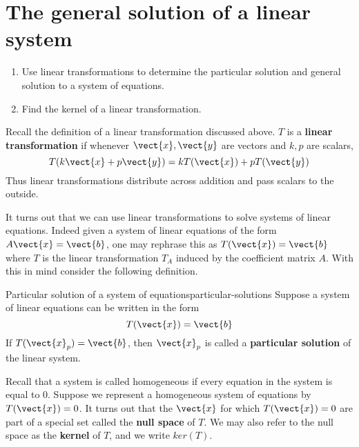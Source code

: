 \section{The general solution of a linear system}

\begin{outcome}
  \begin{enumerate}
  \item Use linear transformations to determine the particular
    solution and general solution to a system of equations.
  \item Find the kernel of a linear transformation.
  \end{enumerate}
\end{outcome}

Recall the definition of a linear transformation discussed above.
$T$ is a \textbf{linear transformation} if whenever $\vect{x}, \vect{y}$ are
vectors and $k,p$ are scalars,
\begin{equation*}
T(k\vect{x}+p\vect{y}) =k T (\vect{x}) +p T(\vect{y})
\end{equation*}
Thus linear transformations distribute across addition and pass scalars to
the outside.

It turns out that we can use linear transformations to solve
systems of linear equations. Indeed given a system of linear equations of the
form $A\vect{x}=\vect{b}$, one may rephrase this as $T(\vect{x})=\vect{b}$ where $T$ is the linear
transformation $T_A$ induced by the coefficient matrix $A$. With this in mind consider the following definition.

\begin{definition}{Particular solution of a system of equations}{particular-solutions}
Suppose a system of linear equations can be written in the form
\begin{equation*}
T(\vect{x})=\vect{b}
\end{equation*}
If $T(\vect{x}_{p})=\vect{b}$,
then $\vect{x}_{p}$ is called a \textbf{particular solution} of
the linear system.
\end{definition}

Recall that a system is called homogeneous if every equation in the system is equal to $0$.
Suppose we represent a homogeneous system of equations by $T(\vect{x})=0$. It turns out
that the $\vect{x}$ for which $T (\vect{x}) = 0$ are part of a special set called the \textbf{null space}
of $T$. We may also refer to the null space as the \textbf{kernel} of $T$, and we write $ker(T)$.

